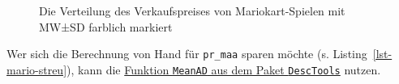 \documentclass[
  letterpaper,
  twoside,
  open=any]{scrbook}
\theoremstyle{definition}
\theoremstyle{definition}
\theoremstyle{definition}
\theoremstyle{remark}
\begin{document}
\begin{figure}

\begin{minipage}{0.50\linewidth}



\end{minipage}%
%
\begin{minipage}{0.50\linewidth}



\end{minipage}%

\caption{\label{fig-var}Die Verteilung des Verkaufspreises von
Mariokart-Spielen mit MW±SD farblich markiert}

\end{figure}%

Wer sich die Berechnung von Hand für \texttt{pr\_maa} sparen möchte (s.
Listing~\ref{lst-mario-streu}), kann die
\href{https://rdrr.io/cran/DescTools/man/MeanAD.html}{Funktion
\texttt{MeanAD} aus dem Paket \texttt{DescTools}} nutzen.
\end{document}
